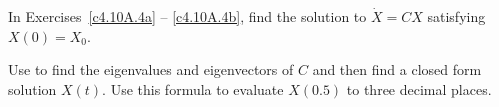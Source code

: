 \documentclass{ximera}
\begin{document}
\noindent In Exercises~\ref{c4.10A.4a} -- \ref{c4.10A.4b}, find the solution 
to $\dot{X} = CX$ satisfying $X(0)=X_0$. %


Use \Matlab to find the eigenvalues and eigenvectors of $C$ 
and then find a closed form solution $X(t)$.  Use this formula to evaluate 
$X(0.5)$ to three decimal places.    
\end{document}
